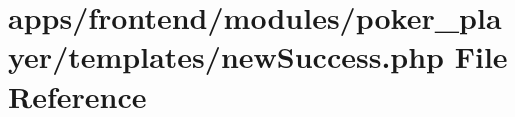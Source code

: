\hypertarget{frontend_2modules_2poker__player_2templates_2new_success_8php}{\section{apps/frontend/modules/poker\-\_\-player/templates/new\-Success.php File Reference}
\label{frontend_2modules_2poker__player_2templates_2new_success_8php}
}
